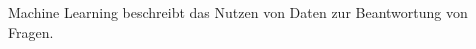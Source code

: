 \documentclass[preview]{standalone}
\begin{document}
\begin{center}
Machine Learning beschreibt das Nutzen von Daten zur Beantwortung von Fragen.
\end{center}
\end{document}
